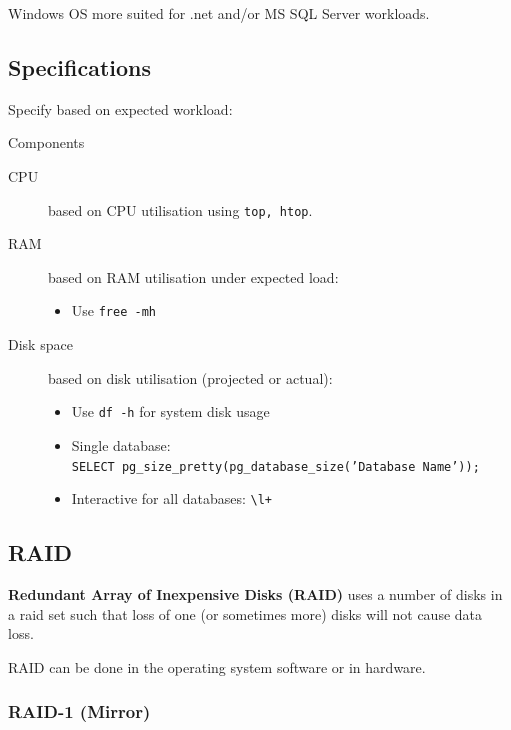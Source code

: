 \documentclass[slides]{pgnotes}
\begin{document}
Windows OS more suited for .net and/or MS SQL Server workloads.

\subsection{Specifications}

Specify based on expected workload:

\begin{bluebox}{Components}
\begin{description}

\item[CPU] based on CPU utilisation using \texttt{top, htop}.

\item[RAM] based on RAM utilisation under expected load:
  \begin{itemize}
  \item Use \texttt{free -mh}
  \end{itemize}

\item[Disk space] based on disk utilisation (projected or actual):
  \begin{itemize}
  \item Use \texttt{df -h} for system disk usage
  \item Single database:\\\texttt{SELECT pg\_size\_pretty(pg\_database\_size('Database Name'));}
  \item Interactive for all databases: \texttt{\textbackslash l+}
  \end{itemize}

\end{description}  
\end{bluebox}


\subsection{RAID}

\textbf{Redundant Array of Inexpensive Disks (RAID)} uses a number of disks in a raid set such that loss of one (or sometimes more) disks will not cause data loss.

RAID can be done in the operating system software or in hardware.



\subsubsection{RAID-1 (Mirror)}
\end{document}

